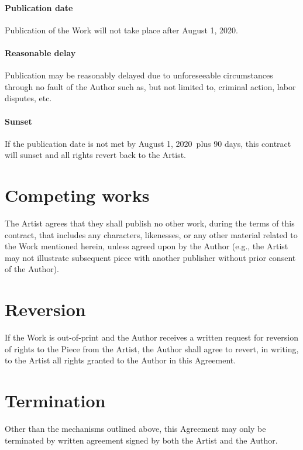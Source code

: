 \documentclass[12pt,letterpaper]{article}
\def\PublicationDate{August 1, 2020}
\begin{document}
\paragraph{Publication date}

Publication of the Work will not take place after \PublicationDate.

\paragraph{Reasonable delay}

Publication may be reasonably delayed due to unforeseeable circumstances through no fault of the Author such as, but not limited to, criminal action, labor disputes, etc.

\paragraph{Sunset}

If the publication date is not met by \PublicationDate\ plus 90 days, this contract will sunset and all rights revert back to the Artist.

\section{Competing works}

The Artist agrees that they shall publish no other work, during the terms of this contract, that includes any characters, likenesses, or any other material related to the Work mentioned herein, unless agreed upon by the Author (e.g., the Artist may not illustrate subsequent piece with another publisher without prior consent of the Author).

\section{Reversion}

If the Work is out-of-print and the Author receives a written request for reversion of rights to the Piece from the Artist, the Author shall agree to revert, in writing, to the Artist all rights granted to the Author in this Agreement.

\section{Termination}

Other than the mechanisms outlined above, this Agreement may only be terminated by written agreement signed by both the Artist and the Author.
\end{document}
